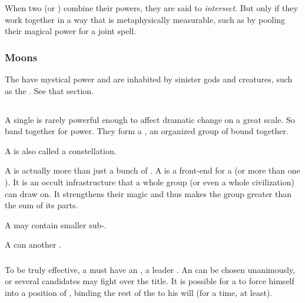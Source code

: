 When two \matrices{} (or \vertices) combine their powers, they are said to \emph{intersect}.
But only if they work together in a way that is metaphysically measurable, such as by pooling their magical power for a joint spell. 





\subsubsection{Moons}
The  have mystical power and are inhabited by sinister gods and creatures, such as the .
See that section.









\subsection{\Matrix}
A single \vertex is rarely powerful enough to affect dramatic change on a great scale. 
So \vertices{} band together for power. 
They form a \matrixx, an organized group of \vertices{} bound together. 

A \matrix{} is also called a constellation. 

A \matrix{} is actually more than just a bunch of \vertices. 
A \matrix{} is a front-end for a \dweomer{} (or more than one \dweomer). 
It is an occult infrastructure that a whole group (or even a whole civilization) can draw on. 
It strengthens their magic and thus makes the group greater than the sum of its parts. 

A \matrix{} may contain smaller sub-\matrices. 

A \matrixx{} can  another \matrixx. 





\subsubsection{\Apex}
\index{\apex}
To be truly effective, a \matrixx{} must have an \apex, a leader \vertex. An \apex{} can be chosen unanimously, or several candidates may fight over the title. It is possible for a \vertex{} to force himself into a position of \apex, binding the rest of the \matrixx{} to his will (for a time, at least). 

